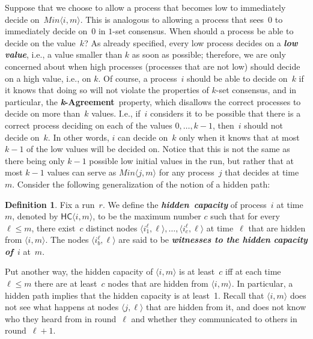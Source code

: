 \documentclass[11pt]{article}
\theoremstyle{definition}
\newtheorem{definition}{Definition}
\newcommand{\minval}[1]{\ensuremath{\mathit{Min}\node{#1}}}
\newcommand{\defemph}[1]{\textbf{\textit{#1}}}
\newcommand{\node}[1]{\langle#1\rangle}
\newcommand{\kAgreement}{{\bf \defemph{k}-Agreement}}
\newcommand{\HC}[1]{\mathsf{HC}\node{#1}}
\begin{document}
Suppose that we choose to allow a process that becomes low to immediately decide on~$\minval{i,m}$. This is analogous to allowing a process that sees~0 to immediately decide on~0 in $1$-set consensus. When should a process be able to decide on the value~$k$?
As already specified, every low process decides on a \defemph{low value}, i.e., a value smaller than $k$ as soon as possible; therefore,
we are only concerned about
when high processes (processes that are not low) should decide on a high value, i.e., on $k$.
Of course, a process~$i$ should be able to decide on~$k$ if it knows that doing so will not violate the properties of $k$-set consensus, and in particular, the \kAgreement\ property, which disallows the correct processes to decide on more than~$k$ values. I.e.,
if~$i$ considers it to be possible that there is a correct process deciding on each of the values $0,\ldots,k-1$, then~$i$ should not decide on~$k$. In other words, $i$ can decide on~$k$ only when it knows that at most $k-1$ of the low values will be decided on. Notice that this is not the same as there being only $k-1$ possible low initial values in the run, but rather that at most $k-1$ values can serve as $\minval{j,m}$ for any process~$j$ that
decides
at time~$m$. Consider the following
generalization of the notion of a hidden path:

\begin{definition}
\label{hiddencapacity}
Fix a run~$r$. We define the \mbox{\defemph{hidden capacity}} of process~$i$ at time~$m$, denoted by
$\HC{i,m}$,
to be the maximum
number $c$ such that  for every $\ell\le m$, there exist~$c$ distinct
nodes
$\node{i_1^{\ell},\ell},\ldots,\node{i_c^\ell,\ell}$ at time~$\ell$ that are hidden from $\node{i,m}$.
The nodes $\node{i_b^{\ell},\ell}$ are said to be \defemph{witnesses to the
hidden capacity of}~$i$ at~$m$.
\end{definition}

Put another way, the hidden capacity of $\node{i,m}$ is at least~$c$ iff at each time $\ell\le m$ there are at least~$c$ nodes that are hidden from $\node{i,m}$. In particular, a hidden path implies that the hidden capacity is at least~1. Recall that $\node{i,m}$ does not see what happens at nodes $\node{j,\ell}$ that are hidden from it, and does not know who they heard from in round~$\ell$ and whether they communicated to others in round~$\ell+1$.
\end{document}
